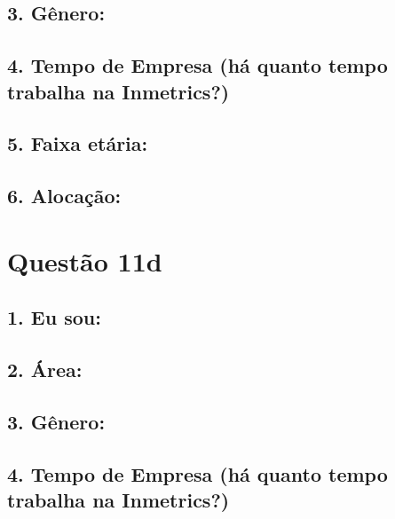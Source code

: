 \documentclass[]{book}
\begin{document}
\hypertarget{genero-14}{%
\subsection{3. Gênero:}\label{genero-14}}

\hypertarget{tempo-de-empresa-ha-quanto-tempo-trabalha-na-inmetrics-14}{%
\subsection{4. Tempo de Empresa (há quanto tempo trabalha na Inmetrics?)}\label{tempo-de-empresa-ha-quanto-tempo-trabalha-na-inmetrics-14}}

\hypertarget{faixa-etaria-14}{%
\subsection{5. Faixa etária:}\label{faixa-etaria-14}}

\hypertarget{alocacao-14}{%
\subsection{6. Alocação:}\label{alocacao-14}}

\hypertarget{questao-11d}{%
\section{Questão 11d}\label{questao-11d}}

\hypertarget{eu-sou-15}{%
\subsection{1. Eu sou:}\label{eu-sou-15}}

\hypertarget{area-15}{%
\subsection{2. Área:}\label{area-15}}

\hypertarget{genero-15}{%
\subsection{3. Gênero:}\label{genero-15}}

\hypertarget{tempo-de-empresa-ha-quanto-tempo-trabalha-na-inmetrics-15}{%
\subsection{4. Tempo de Empresa (há quanto tempo trabalha na Inmetrics?)}\label{tempo-de-empresa-ha-quanto-tempo-trabalha-na-inmetrics-15}}
\end{document}
